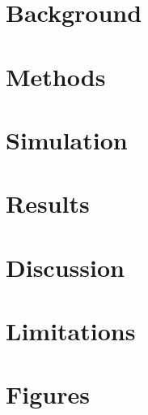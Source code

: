 
\begin{comment}
\frontmatter

\thetitlepage
\cleardoublepage
\setcounter{page}{1}

\section{Abstract}
\uwabstract
\cleardoublepage

\section{Acknowledgments}
I wish to thank my thesis advisor Amalia for her support both in providing input on the direction as well as being a firm advocate on my part in navigating graduate school. It would be unimaginable for me to consider finishing without her support.

My thanks go to my parents Yen and Steve for supporting me throughout the graduate school process and "hanging in there" until the very end. 

\clearpage

\maxtocdepth{subsection}
\tableofcontents\clearpage
\listoffigures\clearpage
\listoftables\clearpage

\mainmatter

\end{comment}
\chapter{Background}

\chapter{Methods}


\chapter{Simulation}

\chapter{Results}

\chapter{Discussion}

\chapter{Limitations}

\chapter{Figures}







